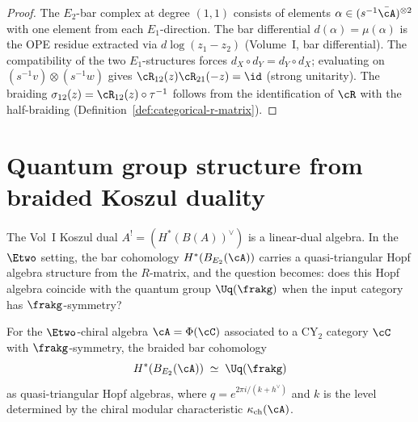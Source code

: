 \begin{proof}
The $E_2$-bar complex at degree $(1,1)$ consists of elements
$\alpha \in (s^{-1}\bar{\cA})^{\otimes 2}$ with one element
from each $E_1$-direction. The bar differential
$d(\alpha) = \mu(\alpha)$ is the OPE residue extracted via
$d\log(z_1 - z_2)$ (Volume~I, bar differential). The
compatibility of the two $E_1$-structures forces
$d_{X} \circ d_{Y} = d_{Y} \circ d_{X}$; evaluating on
$(s^{-1}v) \otimes (s^{-1}w)$ gives
$\cR_{12}(z)\cR_{21}(-z) = \id$ (strong unitarity).
The braiding $\sigma_{12}(z) = \cR_{12}(z) \circ \tau^{-1}$
follows from the identification of $\cR$ with the
half-braiding (Definition~\ref{def:categorical-r-matrix}).
\end{proof}


\section{Quantum group structure from braided Koszul duality}
\label{sec:qg-from-braided-koszul}

The Vol~I Koszul dual $A^! = (H^*(B(A))^{\vee})$ is a linear-dual
algebra. In the $\Etwo$ setting, the bar cohomology
$H^*(B_{E_2}(\cA))$ carries a quasi-triangular Hopf algebra structure
from the $R$-matrix, and the question becomes: does this Hopf algebra
coincide with the quantum group $\Uq(\frakg)$ when the input category
has $\frakg$-symmetry?

\begin{conjecture}
\label{conj:braided-bar-uq}
\ClaimStatusConjectured
For the $\Etwo$-chiral algebra $\cA = \Phi(\cC)$ associated to a
CY$_2$ category $\cC$ with $\frakg$-symmetry, the braided bar
cohomology
\[
 H^*(B_{E_2}(\cA)) \;\simeq\; \Uq(\frakg)
\]
as quasi-triangular Hopf algebras, where $q = e^{2\pi i / (k + h^\vee)}$
and $k$ is the level determined by the chiral modular characteristic
$\kappa_{\mathrm{ch}}(\cA)$.
\end{conjecture}

